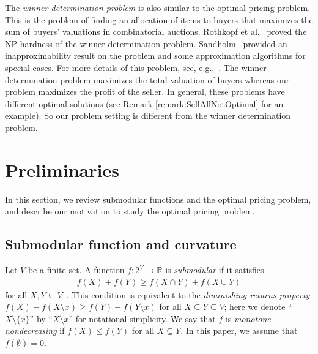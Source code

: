\documentclass[letterpaper]{article}
\theoremstyle{definition}
\begin{document}
The \emph{winner determination problem} is also similar to the optimal pricing problem.
This is the problem of finding an allocation of items to buyers that maximizes the sum of buyers' valuations in combinatorial auctions.
Rothkopf et al.~ proved the NP-hardness of the winner determination problem. %
Sandholm~ provided an inapproximability result on the problem and some approximation algorithms for special cases.
For more details of this problem, see, e.g.,~\cite{nisan2007algorithmic11,cramton2006combinatorial}.
The winner determination problem maximizes the total valuation of buyers whereas our problem maximizes the profit of the seller.
In general, these problems have different optimal solutions (see Remark \ref{remark:SellAllNotOptimal} for an example).
So our problem setting is different from the winner determination problem.



\section{Preliminaries}
\label{sec:preliminaries}

In this section, we review submodular functions and the optimal pricing problem, and describe our motivation to study the optimal pricing problem.



\subsection{Submodular function and curvature}

Let $V$ be a finite set.
A function $f: 2^V \to \mathbb{R}$ is \emph{submodular} if it satisfies
\begin{align}
  \label{eq:submodular}
  f(X) + f(Y) \ge f(X \cap Y) + f(X \cup Y)
\end{align}
for all $X, Y \subseteq V$~\cite{fujishige2005submodular}.
This condition is equivalent to the \emph{diminishing returns property}:
$f(X) - f(X \setminus x) \ge f(Y) - f(Y \setminus x)$
for all $X \subseteq Y \subseteq V$;
here we denote ``$X \setminus \{x\}$'' by ``$X \setminus x$'' for notational simplicity.
We say that $f$ is \emph{monotone nondecreasing} if $f(X) \le f(Y)$ for all $X \subseteq Y$.
In this paper, we assume that $f(\emptyset) = 0$.
\end{document}
